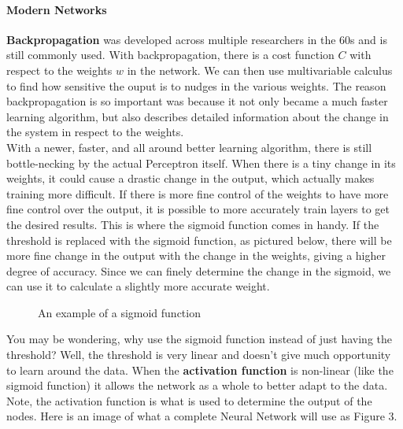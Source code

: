 \documentclass[12pt]{article}
\begin{document}
\paragraph{Modern Networks}
\textbf{Backpropagation} was developed across multiple researchers in the 60s and is still commonly used. With backpropagation, there is a cost function $C$ with respect to the weights $w$ in the network. We can then use multivariable calculus to find how sensitive the ouput is to nudges in the various weights. The reason backpropagation is so important was because it not only became a much faster learning algorithm, but also describes detailed information about the change in the system in respect to the weights.  \\

With a newer, faster, and all around better learning algorithm, there is still bottle-necking by the actual Perceptron itself. When there is a tiny change in its weights, it could cause a drastic change in the output, which actually makes training more difficult. If there is more fine control of the weights to have more fine control over the output, it is possible to more accurately train layers to get the desired results. This is where the sigmoid function comes in handy. If the threshold is replaced with the sigmoid function, as pictured below, there will be more fine change in the output with the change in the weights, giving a higher degree of accuracy. Since we can finely determine the change in the sigmoid, we can use it to calculate a slightly more accurate weight.

\begin{figure}[H]
    \centering
    \def\svgwidth{\columnwidth}
    
    \caption{An example of a sigmoid function}
\end{figure}

You may be wondering, why use the sigmoid function instead of just having the threshold? Well, the threshold is very linear and doesn't give much opportunity to learn around the data. When the \textbf{activation function} is non-linear (like the sigmoid function) it allows the network as a whole to better adapt to the data. Note, the activation function is what is used to determine the output of the nodes. Here is an image of what a complete Neural Network will use as Figure 3. \cite{nielsen_a._1970}
\end{document}

